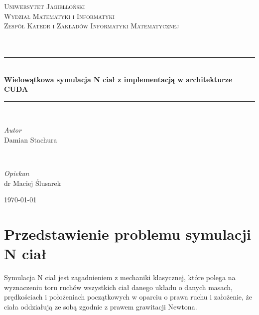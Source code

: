 \documentclass[14pt,twoside,a4paper]{article}
\theoremstyle{definition}
\begin{document}
\begin{titlepage}
	\newcommand{\HRule}{\rule{\linewidth}{0.5mm}}
	
	\center
	
	\textsc{\Large Uniwersytet  Jagielloński\\
			 Wydział Matematyki i Informatyki\\
    		 Zespół Katedr i Zakładów Informatyki Matematycznej}\\[1.5cm]
	
	\textsc{\Large}\\[0.5cm]
	
	\textsc{\Large}\\[0.5cm]
	
	\HRule\\[0.4cm]
		
	{\huge\bfseries Wielowątkowa symulacja N ciał z implementacją w architekturze CUDA}\\[0.4cm] %
	
	\HRule\\[1.5cm]
	
	\begin{minipage}{0.4\textwidth}
		\begin{flushleft}
			\large
			\textit{Autor}\\
			Damian Stachura%
		\end{flushleft}
	\end{minipage}
	~
	\begin{minipage}{0.4\textwidth}
		\begin{flushright}
			\large
			\textit{Opiekun}\\
			dr Maciej Ślusarek %
		\end{flushright}
	\end{minipage}
	
	\vfill\vfill %
	
	{\large\today} %
	
\end{titlepage}

\newpage
\tableofcontents

\newpage

\section{\LARGE Przedstawienie problemu symulacji N ciał}
\bigskip
Symulacja N ciał jest zagadnieniem z mechaniki klasycznej, które polega na wyznaczeniu toru ruchów wszystkich ciał danego układu o danych masach, prędkościach i położeniach początkowych w oparciu o prawa ruchu i założenie, że ciała oddziałują ze sobą zgodnie z prawem grawitacji Newtona. \\
\end{document}
